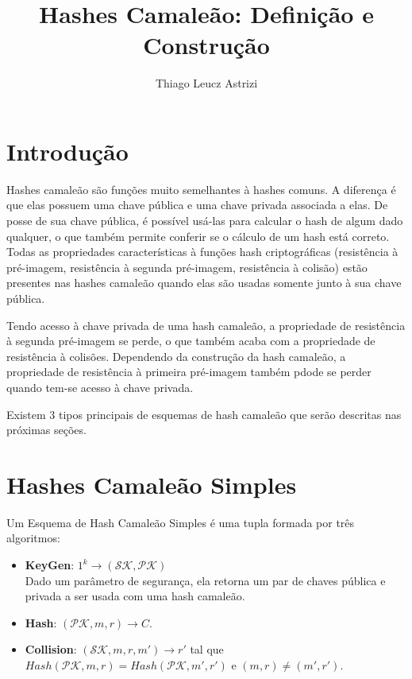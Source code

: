 \documentclass[a4paper]{article}
\title{Hashes Camaleão: Definição e Construção}
\author{Thiago Leucz Astrizi}
\begin{document}
\maketitle

\section{Introdução}

Hashes camaleão são funções muito semelhantes à hashes comuns. A
diferença é que elas possuem uma chave pública e uma chave privada
associada a elas. De posse de sua chave pública, é possível usá-las
para calcular o hash de algum dado qualquer, o que também permite
conferir se o cálculo de um hash está correto. Todas as propriedades
características à funções hash criptográficas (resistência à
pré-imagem, resistência à segunda pré-imagem, resistência à colisão)
estão presentes nas hashes camaleão quando elas são usadas somente
junto à sua chave pública.

Tendo acesso à chave privada de uma hash camaleão, a propriedade de
resistência à segunda pré-imagem se perde, o que também acaba com a
propriedade de resistência à colisões. Dependendo da construção da
hash camaleão, a propriedade de resistência à primeira pré-imagem
também pdode se perder quando tem-se acesso à chave privada.

Existem 3 tipos principais de esquemas de hash camaleão que serão
descritas nas próximas seções.

\section{Hashes Camaleão Simples}

Um Esquema de Hash Camaleão Simples é uma tupla formada por três
algoritmos:

\begin{itemize}
\item\textbf{KeyGen}: $1^k \rightarrow (\mathcal{SK}, \mathcal{PK})$\\
  Dado um parâmetro de segurança, ela retorna um par de chaves pública
  e privada a ser usada com uma hash camaleão.
\item\textbf{Hash}: $(\mathcal{PK}, m, r) \rightarrow C$. 
\item\textbf{Collision}: $(\mathcal{SK}, m, r, m') \rightarrow r'$
  tal que $Hash(\mathcal{PK}, m, r) = Hash(\mathcal{PK}, m', r')$ e
  $(m, r) \neq (m', r')$.
\end{itemize}
\end{document}

